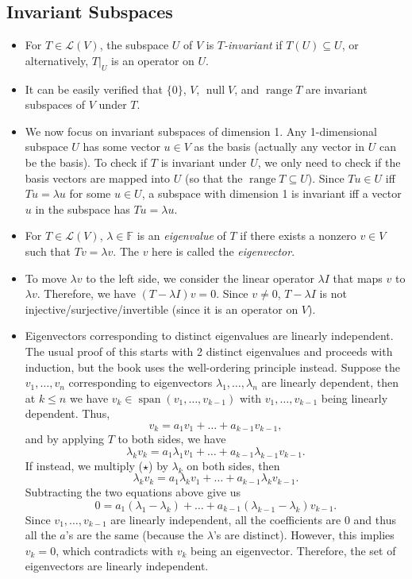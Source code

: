 \documentclass{article}
\newcommand{\F}{\mathbb{F}}
\newcommand{\s}{\operatorname{span}}
\newcommand{\n}{\operatorname{null}}
\renewcommand{\r}{\operatorname{range}}
\newcommand{\LV}{\mathcal{L}(V)}
\newcommand{\bv}{v_1,\dots,v_n}
\begin{document}
\subsection{Invariant Subspaces}
\begin{itemize}
    \item For $T \in \LV$, the subspace $U$ of $V$ is \textit{$T$-invariant} if $T(U) \subseteq U$, or alternatively, $T|_U$ is an operator on $U$.
    \item It can be easily verified that $\{0\}$, $V$, $\n V$, and $\r T$ are invariant subspaces of $V$ under $T$.
    \item We now focus on invariant subspaces of dimension 1. Any 1-dimensional subspace $U$ has some vector $u \in V$ as the basis (actually any vector in $U$ can be the basis). To check if $T$ is invariant under $U$, we only need to check if the basis vectors are mapped into $U$ (so that the $\r T \subseteq U$). Since $Tu \in U$ iff $Tu = \lambda u$ for some $u \in U$, a subspace with dimension 1 is invariant iff a vector $u$ in the subspace has $Tu = \lambda u$.
    \item For $T \in \LV$, $\lambda \in \F$ is an \textit{eigenvalue} of $T$ if there exists a nonzero $v \in V$ such that $Tv = \lambda v$. The $v$ here is called the \textit{eigenvector}.
    \item To move $\lambda v$ to the left side, we consider the linear operator $\lambda I$ that maps $v$ to $\lambda v$. Therefore, we have $(T-\lambda I) v = 0$. Since $v \not= 0$, $T-\lambda I$ is not injective/surjective/invertible (since it is an operator on $V$).
    \item Eigenvectors corresponding to distinct eigenvalues are linearly independent. The usual proof of this starts with 2 distinct eigenvalues and proceeds with induction, but the book uses the well-ordering principle instead. Suppose the $\bv$ corresponding to eigenvectors $\lambda_1,\dots,\lambda_n$ are linearly dependent, then at $k \leq n$ we have $v_k \in \s(v_1,\dots,v_{k-1})$ with $v_1,\dots,v_{k-1}$ being linearly dependent. Thus, 
    \begin{equation}
        v_k = a_1 v_1 + \dots + a_{k-1}v_{k-1}, \tag{$\star$}
    \end{equation}
    and by applying $T$ to both sides, we have $$\lambda_k v_k = a_1 \lambda_1 v_1 + \dots + a_{k-1} \lambda_{k-1}v_{k-1}.$$ If instead, we multiply ($\star$) by $\lambda_k$ on both sides, then $$\lambda_k v_k = a_1 \lambda_k v_1 + \dots + a_{k-1} \lambda_k v_{k-1}.$$ Subtracting the two equations above give us $$0 = a_1 (\lambda_1 - \lambda_k) + \dots + a_{k-1} (\lambda_{k-1}-\lambda_k) v_{k-1}.$$ Since $v_1, \dots, v_{k-1}$ are linearly independent, all the coefficients are 0 and thus all the $a$'s are the same (because the $\lambda$'s are distinct). However, this implies $v_k = 0$, which contradicts with $v_k$ being an eigenvector. Therefore, the set of eigenvectors are linearly independent.

\end{itemize}
\end{document}
